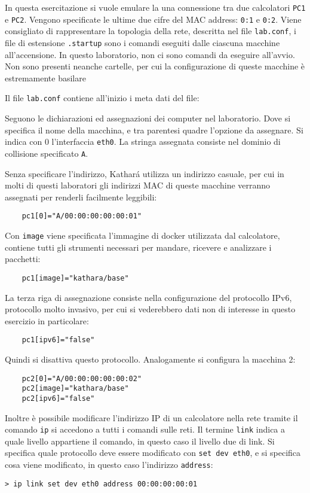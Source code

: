 \documentclass{article}
\numberwithin{equation}{subsection}
\begin{document}
In questa esercitazione si vuole emulare la una connessione tra due calcolatori \verb|PC1| e \verb|PC2|. Vengono 
specificate le ultime due cifre del MAC address: \verb|0:1| e \verb|0:2|. 
Viene consigliato di rappresentare la topologia della rete, descritta nel file \verb|lab.conf|, i file di estensione \verb|.startup| sono i 
comandi eseguiti dalle ciascuna macchine all'accensione. In questo laboratorio, non ci sono comandi da eseguire all'avvio. Non sono presenti 
neanche cartelle, per cui la configurazione di queste macchine è estremamente basilare



Il file \verb|lab.conf| contiene all'inizio i meta dati del file:

Seguono le dichiarazioni ed assegnazioni dei computer nel laboratorio. Dove si 
specifica il nome della macchina, e tra parentesi quadre l'opzione da assegnare. 
Si indica con $0$ l'interfaccia \verb|eth0|. La stringa assegnata consiste nel 
dominio di collisione specificato \verb|A|. 

Senza specificare l'indirizzo, Kathar\'{a} utilizza un indirizzo casuale, per cui 
in molti di questi laboratori gli indirizzi MAC di queste macchine verranno 
assegnati per renderli facilmente leggibili:

\begin{verbatim}
	pc1[0]="A/00:00:00:00:00:01"
\end{verbatim}

Con \verb|image| viene specificata l'immagine di docker utilizzata dal calcolatore, 
contiene tutti gli strumenti necessari per mandare, ricevere e analizzare i pacchetti: 
\begin{verbatim}
	pc1[image]="kathara/base"
\end{verbatim}
La terza riga di assegnazione consiste nella configurazione del protocollo 
IPv6, protocollo molto invasivo, per cui si vederebbero dati non di interesse 
in questo esercizio in particolare:
\begin{verbatim}
	pc1[ipv6]="false"
\end{verbatim} 
Quindi si disattiva questo protocollo. Analogamente 
si configura la macchina 2:
\begin{verbatim}
	pc2[0]="A/00:00:00:00:00:02"
	pc2[image]="kathara/base"
	pc2[ipv6]="false"
\end{verbatim}
Inoltre è possibile modificare l'indirizzo IP di un calcolatore nella rete 
tramite il comando \verb|ip| si accedono a tutti i comandi sulle reti. 
Il termine \verb|link| indica a quale livello appartiene il comando, in questo caso il livello due di link. 
Si specifica quale protocollo deve essere modificato con \verb|set dev eth0|, e si specifica cosa viene modificato, in questo caso l'indirizzo \verb|address|:
\begin{verbatim}
> ip link set dev eth0 address 00:00:00:00:01
\end{verbatim}
\end{document}
